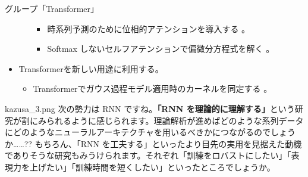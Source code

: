 \documentclass[b5paper,xelatex,ja=standard,10pt]{bxjsarticle}
\begin{document}
\begin{PROP}[left=0pt]{グループ「Transformer」}
\begin{itemize}
\begin{itemize}
\begin{itemize}
      \item 時系列予測のために位相的アテンションを導入する \cite{SebastianZeng2021}。
      \item Softmax しないセルフアテンションで偏微分方程式を解く \cite{ShuhaoCao2021}。
    \end{itemize}
  \end{itemize}
  \vspace{6pt}
  \item Transformerを新しい用途に利用する。
  \begin{itemize}
    \item Transformerでガウス過程モデル適用時のカーネルを同定する \cite{FergusSimpson2021}。
  \end{itemize}
\end{itemize}
\end{PROP}
\vspace{1pt}

\begin{SERIFU}[colback=PaleIris, colbacktitle=PaleIris2]{kazusa_3.png}
次の勢力は RNN ですね。\textbf{「RNN を理論的に理解する」}という研究が割にみられるように感じられます。理論解析が進めばどのような系列データにどのようなニューラルアーキテクチャを用いるべきかにつながるのでしょうか……?? もちろん、「RNN を工夫する」といったより目先の実用を見据えた動機でありそうな研究もみうけられます。それぞれ「訓練をロバストにしたい」「表現力を上げたい」「訓練時間を短くしたい」といったところでしょうか。
\end{SERIFU}
\end{document}
